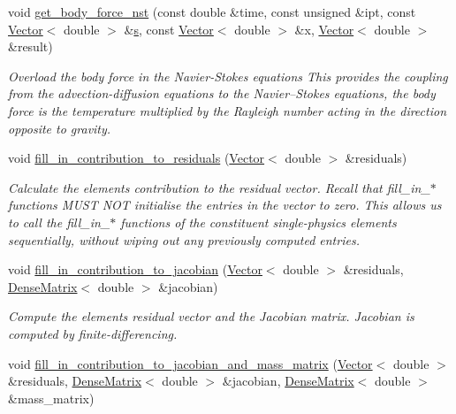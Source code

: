 \begin{DoxyCompactItemize}
void \hyperlink{classoomph_1_1BuoyantQCrouzeixRaviartElement_aeeef7868070fd692b33e5afa811af1da}{get\+\_\+body\+\_\+force\+\_\+nst} (const double \&time, const unsigned \&ipt, const \hyperlink{classoomph_1_1Vector}{Vector}$<$ double $>$ \&\hyperlink{cfortran_8h_ab7123126e4885ef647dd9c6e3807a21c}{s}, const \hyperlink{classoomph_1_1Vector}{Vector}$<$ double $>$ \&x, \hyperlink{classoomph_1_1Vector}{Vector}$<$ double $>$ \&result)
\begin{DoxyCompactList}\small\item\em Overload the body force in the Navier-\/\+Stokes equations This provides the coupling from the advection-\/diffusion equations to the Navier--Stokes equations, the body force is the temperature multiplied by the Rayleigh number acting in the direction opposite to gravity. \end{DoxyCompactList}\item 
void \hyperlink{classoomph_1_1BuoyantQCrouzeixRaviartElement_ab87ed100a54d40884a70a67fcc305ecf}{fill\+\_\+in\+\_\+contribution\+\_\+to\+\_\+residuals} (\hyperlink{classoomph_1_1Vector}{Vector}$<$ double $>$ \&residuals)
\begin{DoxyCompactList}\small\item\em Calculate the element\textquotesingle{}s contribution to the residual vector. Recall that fill\+\_\+in\+\_\+$\ast$ functions M\+U\+ST N\+OT initialise the entries in the vector to zero. This allows us to call the fill\+\_\+in\+\_\+$\ast$ functions of the constituent single-\/physics elements sequentially, without wiping out any previously computed entries. \end{DoxyCompactList}\item 
void \hyperlink{classoomph_1_1BuoyantQCrouzeixRaviartElement_a7bd9313dd697c1219cee4a65692388b5}{fill\+\_\+in\+\_\+contribution\+\_\+to\+\_\+jacobian} (\hyperlink{classoomph_1_1Vector}{Vector}$<$ double $>$ \&residuals, \hyperlink{classoomph_1_1DenseMatrix}{Dense\+Matrix}$<$ double $>$ \&jacobian)
\begin{DoxyCompactList}\small\item\em Compute the element\textquotesingle{}s residual vector and the Jacobian matrix. Jacobian is computed by finite-\/differencing. \end{DoxyCompactList}\item 
void \hyperlink{classoomph_1_1BuoyantQCrouzeixRaviartElement_a7d22156d87949e4c64d597d60fe00225}{fill\+\_\+in\+\_\+contribution\+\_\+to\+\_\+jacobian\+\_\+and\+\_\+mass\+\_\+matrix} (\hyperlink{classoomph_1_1Vector}{Vector}$<$ double $>$ \&residuals, \hyperlink{classoomph_1_1DenseMatrix}{Dense\+Matrix}$<$ double $>$ \&jacobian, \hyperlink{classoomph_1_1DenseMatrix}{Dense\+Matrix}$<$ double $>$ \&mass\+\_\+matrix)

\end{DoxyCompactItemize}
